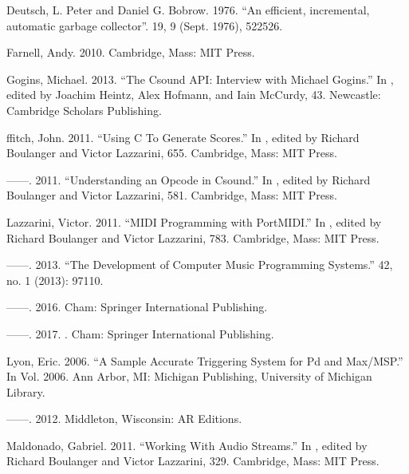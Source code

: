 \documentclass[letterpaper,10pt,english]{sphinxmanual}
\begin{document}
\sphinxAtStartPar
Deutsch, L. Peter and Daniel G. Bobrow. 1976. “An efficient, incremental, automatic garbage collector”.  19, 9 (Sept. 1976), 522\textendash{}526.

\sphinxAtStartPar
Farnell, Andy. 2010.  Cambridge, Mass: MIT Press.

\sphinxAtStartPar
Gogins, Michael. 2013. “The Csound API: Interview with Michael Gogins.” In , edited by Joachim Heintz, Alex Hofmann, and Iain McCurdy, 43. Newcastle: Cambridge Scholars Publishing.

\sphinxAtStartPar
ffitch, John. 2011. “Using C To Generate Scores.” In , edited by Richard Boulanger and Victor Lazzarini, 655. Cambridge, Mass: MIT Press.

\sphinxAtStartPar
——. 2011. “Understanding an Opcode in Csound.” In , edited by Richard Boulanger and Victor Lazzarini, 581. Cambridge, Mass: MIT Press.

\sphinxAtStartPar
Lazzarini, Victor. 2011. “MIDI Programming with PortMIDI.” In , edited by Richard Boulanger and Victor Lazzarini, 783. Cambridge, Mass: MIT Press.

\sphinxAtStartPar
——. 2013. “The Development of Computer Music Programming Systems.”  42, no. 1 (2013): 97\sphinxhyphen{}110.

\sphinxAtStartPar
——. 2016.  Cham: Springer International Publishing.

\sphinxAtStartPar
——. 2017. . Cham: Springer International Publishing.

\sphinxAtStartPar
Lyon, Eric. 2006. “A Sample Accurate Triggering System for Pd and Max/MSP.” In  Vol. 2006. Ann Arbor, MI: Michigan Publishing, University of Michigan Library.

\sphinxAtStartPar
——. 2012.  Middleton, Wisconsin: A\sphinxhyphen{}R Editions.

\sphinxAtStartPar
Maldonado, Gabriel. 2011. “Working With Audio Streams.” In , edited by Richard Boulanger and Victor Lazzarini, 329. Cambridge, Mass: MIT Press.
\end{document}

